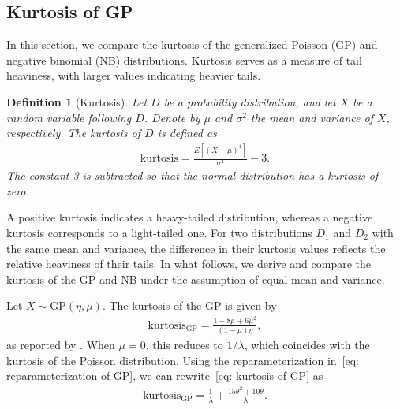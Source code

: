 \documentclass[pdflatex,sn-basic]{sn-jnl}%
\theoremstyle{thmstyleone}%
\theoremstyle{thmstyletwo}%
\theoremstyle{thmstylethree}%
\newtheorem{definition}{Definition}%
\begin{document}
\begin{appendices}
\section{Kurtosis of GP}\label{Sec: Kurtosis of GP}

In this section, we compare the kurtosis of the generalized Poisson (GP) and negative binomial (NB) distributions.  
Kurtosis serves as a measure of tail heaviness, with larger values indicating heavier tails.

\begin{definition}[Kurtosis]\label{kurtosis}
Let $D$ be a probability distribution, and let $X$ be a random variable following $D$.  
Denote by $\mu$ and $\sigma^{2}$ the mean and variance of $X$, respectively.  
The kurtosis of $D$ is defined as
\begin{align}
	\mathrm{kurtosis} = \frac{E[(X-\mu)^{4}]}{\sigma^{4}} - 3. \label{eq: kurtosis}
\end{align}
The constant 3 is subtracted so that the normal distribution has a kurtosis of zero.
\end{definition}

A positive kurtosis indicates a heavy-tailed distribution, whereas a negative kurtosis corresponds to a light-tailed one.  
For two distributions $D_{1}$ and $D_{2}$ with the same mean and variance, the difference in their kurtosis values reflects the relative heaviness of their tails.  
In what follows, we derive and compare the kurtosis of the GP and NB under the assumption of equal mean and variance.

Let $X \sim \mathrm{GP}(\eta,\mu)$.  
The kurtosis of the GP is given by
\begin{align}
	\mathrm{kurtosis}_{\text{GP}} = \frac{1 + 8\mu + 6\mu^{2}}{(1 - \mu)\eta}, \label{eq: kurtosis of GP}
\end{align}
as reported by \citet{IBEJI2020e00494}.  
When $\mu = 0$, this reduces to $1/\lambda$, which coincides with the kurtosis of the Poisson distribution.  
Using the reparameterization in~\eqref{eq: reparameterization of GP}, we can rewrite~\eqref{eq: kurtosis of GP} as
\begin{align}
	\mathrm{kurtosis}_{\text{GP}} = \frac{1}{\lambda} + \frac{15\theta^{2} + 10\theta}{\lambda}. \label{eq: kurtosis of GP in case of reparameterization}
\end{align}


\end{appendices}
\end{document}
